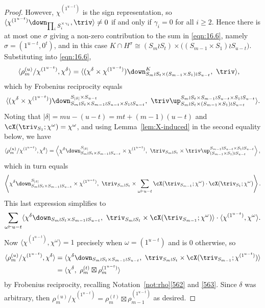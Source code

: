 \begin{proof}
	However, $\chi^{(1^{u-t})}$ is the sign representation, so $\langle \chi^{(1^{u-t})}\down_{\prod_i S_i^{\times\gamma_i}},\triv\rangle\ne 0$ if and only if $\gamma_i=0$ for all $i\ge 2$. Hence there is at most one $\sigma$ giving a non-zero contribution to the sum in \eqref{eqn:16.6}, namely $\sigma=(1^{u-t},0^t)$, and in this case $K\cap H^\sigma\cong (S_m\wr S_t)\times \big((S_{m-1}\times S_1)\wr S_{u-t}\big)$. Substituting into \eqref{eqn:16.6},
	\begin{align*}
		\langle \rho^{(u)}_m/\chi^{(1^{u-t})}, \chi^\delta\rangle &= \langle (\chi^\delta\times\chi^{(1^{u-t})})\down^K_{S_m\wr S_t\times (S_{m-1}\times S_1)\wr S_{u-t}},\ \triv\rangle,
		\end{align*}
which by Frobenius reciprocity equals
		\[\langle (\chi^\delta\times\chi^{(1^{u-t})})\down^{S_{|\delta|}\times S_{u-t}}_{S_m\wr S_t\times S_{m-1}\wr S_{u-t}\times S_1\wr S_{u-t}},\ \triv\up_{S_m\wr S_t\times (S_{m-1}\times S_1)\wr S_{u-t}}^{{S_m\wr S_t\times S_{m-1}\wr S_{u-t}\times S_1\wr S_{u-t}}}\rangle.
	\]
		 Noting that $|\delta|=mu-(u-t)=mt+(m-1)(u-t)$ and $\cX(\triv_{S_1};\chi^\omega)=\chi^\omega$, and using Lemma~\ref{lem:X-induced} in the second equality below, we have
	\begin{align*}
		\langle \rho^{(u)}_m/\chi^{(1^{u-t})}, \chi^\delta\rangle = \left\langle \chi^\delta\down^{S_{|\delta|}}_{S_m\wr S_t\times S_{m-1}\wr S_{u-t}} \times \chi^{(1^{u-t})},\ \triv_{S_m\wr S_t} \times \triv\up_{(S_{m-1}\times S_1)\wr S_{u-t}}^{S_{m-1}\wr S_{u-t}\times S_1\wr S_{u-t}}\right\rangle,
		\end{align*}
which in turn equals
\[
 \left\langle \chi^\delta\down^{S_{|\delta|}}_{S_m\wr S_t\times S_{m-1}\wr S_{u-t}} \times \chi^{(1^{u-t})},\ \triv_{S_m\wr S_t} \times \sum_{\omega\vdash u-t}\cX(\triv_{S_{m-1}}; \chi^\omega)\cdot\cX(\triv_{S_1};\chi^\omega) \right\rangle.
 \]
 This last expression simplifies to
\[
 \sum_{\omega\vdash u-t} \langle \chi^\delta\down_{S_m\wr S_t\times S_{m-1}\wr S_{u-t}},\ \triv_{S_m\wr S_t}\times \cX(\triv_{S_{m-1}};\chi^\omega)\rangle\cdot\langle \chi^{(1^{u-t})},\chi^\omega\rangle.
 \]
Now $\langle \chi^{(1^{u-t})},\chi^\omega\rangle=1$ precisely when $\omega=(1^{u-t})$ and is 0 otherwise, so
	\begin{align*} \langle \rho^{(u)}_m/\chi^{(1^{u-t})}, \chi^\delta\rangle &= \langle \chi^\delta\down_{S_m\wr S_t\times S_{m-1}\wr S_{u-t}},\ \triv_{S_m\wr S_t}\times \cX(\triv_{S_{m-1}};\chi^{(1^{u-t})})\rangle\\ &= \langle \chi^\delta,\ \rho^{(t)}_m\boxtimes \rho^{(1^{u-t})}_m\rangle \end{align*}
	by Frobenius reciprocity, recalling Notation~\ref{not:rho}\ref{562} and \ref{563}.
	Since $\delta$ was arbitrary, then $\rho^{(u)}_m/\chi^{(1^{u-t})} = \rho^{(t)}_m\boxtimes \rho^{(1^{u-t})}_{m-1}$ as desired.
\end{proof}
